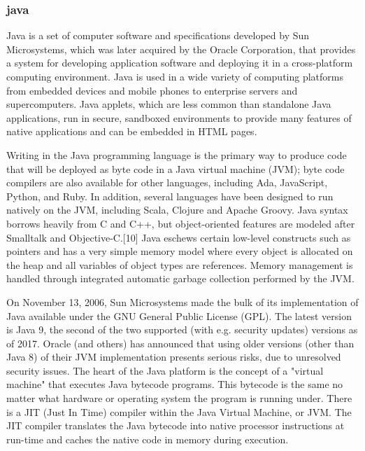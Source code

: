 \documentclass[a4paper,12pt]{article}
\begin{document}
\newpage

\subsubsection{java}

Java is a set of computer software and specifications developed by Sun Microsystems, which was later acquired by the Oracle Corporation, that provides a system for developing application software and deploying it in a cross-platform computing environment. Java is used in a wide variety of computing platforms from embedded devices and mobile phones to enterprise servers and supercomputers. Java applets, which are less common than standalone Java applications, run in secure, sandboxed environments to provide many features of native applications and can be embedded in HTML pages.
\vspace{5mm}\newline\par
Writing in the Java programming language is the primary way to produce code that will be deployed as byte code in a Java virtual machine (JVM); byte code compilers are also available for other languages, including Ada, JavaScript, Python, and Ruby. In addition, several languages have been designed to run natively on the JVM, including Scala, Clojure and Apache Groovy. Java syntax borrows heavily from C and C++, but object-oriented features are modeled after Smalltalk and Objective-C.[10] Java eschews certain low-level constructs such as pointers and has a very simple memory model where every object is allocated on the heap and all variables of object types are references. Memory management is handled through integrated automatic garbage collection performed by the JVM.
\vspace{5mm}\newline\par
On November 13, 2006, Sun Microsystems made the bulk of its implementation of Java available under the GNU General Public License (GPL). The latest version is Java 9, the second of the two supported (with e.g. security updates) versions as of 2017. Oracle (and others) has announced that using older versions (other than Java 8) of their JVM implementation presents serious risks, due to unresolved security issues.
\newpage
The heart of the Java platform is the concept of a "virtual machine" that executes Java bytecode programs. This bytecode is the same no matter what hardware or operating system the program is running under. There is a JIT (Just In Time) compiler within the Java Virtual Machine, or JVM. The JIT compiler translates the Java bytecode into native processor instructions at run-time and caches the native code in memory during execution.
\end{document}

